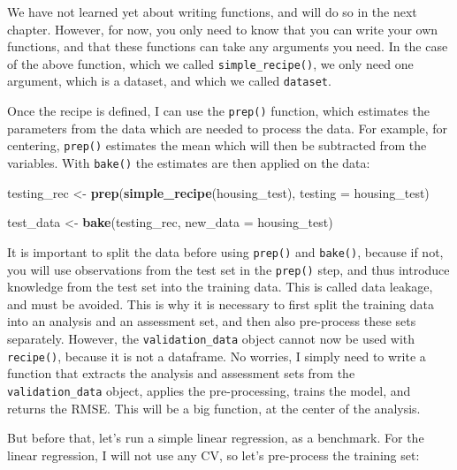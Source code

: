 \documentclass[
]{article}
\newenvironment{Shaded}{\begin{snugshade}}{\end{snugshade}}
\newcommand{\DataTypeTok}[1]{\textcolor[rgb]{0.13,0.29,0.53}{#1}}
\newcommand{\KeywordTok}[1]{\textcolor[rgb]{0.13,0.29,0.53}{\textbf{#1}}}
\newcommand{\NormalTok}[1]{#1}
\newcommand{\StringTok}[1]{\textcolor[rgb]{0.31,0.60,0.02}{#1}}
\begin{document}
We have not learned yet about writing functions, and will do so in the next chapter. However, for
now, you only need to know that you can write your own functions, and that these functions can
take any arguments you need. In the case of the above function, which we called \texttt{simple\_recipe()},
we only need one argument, which is a dataset, and which we called \texttt{dataset}.

Once the recipe is defined, I can use the \texttt{prep()} function, which estimates the parameters from
the data which are needed to process the data. For example, for centering, \texttt{prep()} estimates
the mean which will then be subtracted from the variables. With \texttt{bake()} the estimates are then
applied on the data:

\begin{Shaded}
\begin{Highlighting}[]
\NormalTok{testing\_rec \textless{}{-}}\StringTok{ }\KeywordTok{prep}\NormalTok{(}\KeywordTok{simple\_recipe}\NormalTok{(housing\_test), }\DataTypeTok{testing =}\NormalTok{ housing\_test)}

\NormalTok{test\_data \textless{}{-}}\StringTok{ }\KeywordTok{bake}\NormalTok{(testing\_rec, }\DataTypeTok{new\_data =}\NormalTok{ housing\_test)}
\end{Highlighting}
\end{Shaded}

It is important to split the data before using \texttt{prep()} and \texttt{bake()}, because if not, you will
use observations from the test set in the \texttt{prep()} step, and thus introduce knowledge from the test
set into the training data. This is called data leakage, and must be avoided. This is why it is
necessary to first split the training data into an analysis and an assessment set, and then also
pre-process these sets separately. However, the \texttt{validation\_data} object cannot now be used with
\texttt{recipe()}, because it is not a dataframe. No worries, I simply need to write a function that extracts
the analysis and assessment sets from the \texttt{validation\_data} object, applies the pre-processing, trains
the model, and returns the RMSE. This will be a big function, at the center of the analysis.

But before that, let's run a simple linear regression, as a benchmark. For the linear regression, I will
not use any CV, so let's pre-process the training set:
\end{document}
